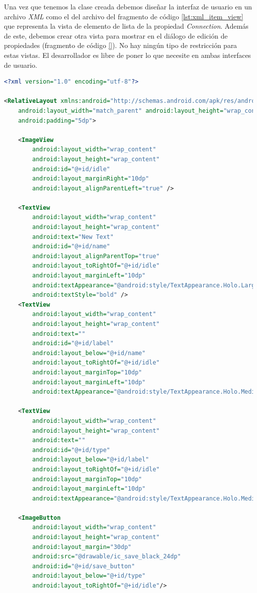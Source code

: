 \bigskip
Una vez que tenemos la clase creada debemos diseñar la interfaz de usuario en un archivo \textit{XML} como el del archivo del fragmento de código \ref{lst:xml_item_view} que representa la vista de elemento de lista de la propiedad \textit{Connection}. Además de este, debemos crear otra vista para mostrar en el diálogo de edición de propiedades (fragmento de código \ref{}). No hay ningún tipo de restricción para estas vistas. El desarrollador es libre de poner lo que necesite en ambas interfaces de usuario.

\begin{lstlisting}[language=XML,caption={Vista item XML de una propiedad},label={lst:xml_item_view}]
<?xml version="1.0" encoding="utf-8"?>

<RelativeLayout xmlns:android="http://schemas.android.com/apk/res/android"
    android:layout_width="match_parent" android:layout_height="wrap_content"
    android:padding="5dp">

    <ImageView
        android:layout_width="wrap_content"
        android:layout_height="wrap_content"
        android:id="@+id/idle"
        android:layout_marginRight="10dp"
        android:layout_alignParentLeft="true" />

    <TextView
        android:layout_width="wrap_content"
        android:layout_height="wrap_content"
        android:text="New Text"
        android:id="@+id/name"
        android:layout_alignParentTop="true"
        android:layout_toRightOf="@+id/idle"
        android:layout_marginLeft="10dp"
        android:textAppearance="@android:style/TextAppearance.Holo.Large"
        android:textStyle="bold" />
    <TextView
        android:layout_width="wrap_content"
        android:layout_height="wrap_content"
        android:text=""
        android:id="@+id/label"
        android:layout_below="@+id/name"
        android:layout_toRightOf="@+id/idle"
        android:layout_marginTop="10dp"
        android:layout_marginLeft="10dp"
        android:textAppearance="@android:style/TextAppearance.Holo.Medium" />

    <TextView
        android:layout_width="wrap_content"
        android:layout_height="wrap_content"
        android:text=""
        android:id="@+id/type"
        android:layout_below="@+id/label"
        android:layout_toRightOf="@+id/idle"
        android:layout_marginTop="10dp"
        android:layout_marginLeft="10dp"
        android:textAppearance="@android:style/TextAppearance.Holo.Medium" />

    <ImageButton
        android:layout_width="wrap_content"
        android:layout_height="wrap_content"
        android:layout_margin="30dp"
        android:src="@drawable/ic_save_black_24dp"
        android:id="@+id/save_button"
        android:layout_below="@+id/type"
        android:layout_toRightOf="@+id/idle"/>


\end{lstlisting}
